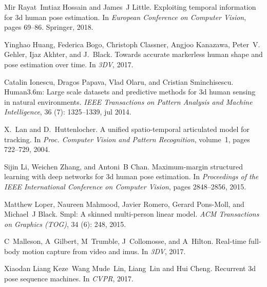 \documentclass{bmvc2k}
\begin{document}
\begin{thebibliography}{47}
Mir Rayat~Imtiaz Hossain and James~J Little.
\newblock Exploiting temporal information for 3d human pose estimation.
\newblock In \emph{European Conference on Computer Vision}, pages 69--86.
  Springer, 2018.

Yinghao Huang, Federica Bogo, Christoph Classner, Angjoo Kanazawa, Peter~V.
  Gehler, Ijaz Akhter, and J.~Black.
\newblock Towards accurate markerless human shape and pose estimation over
  time.
\newblock In \emph{3DV}, 2017.

Catalin Ionescu, Dragos Papava, Vlad Olaru, and Cristian Sminchisescu.
\newblock Human3.6m: Large scale datasets and predictive methods for 3d human
  sensing in natural environments.
\newblock \emph{IEEE Transactions on Pattern Analysis and Machine
  Intelligence}, 36 (7): 1325--1339, jul 2014.

X.~Lan and D.~Huttenlocher.
\newblock A unified spatio-temporal articulated model for tracking.
\newblock In \emph{Proc. Computer Vision and Pattern Recognition}, volume~1,
  pages 722--729, 2004.

Sijin Li, Weichen Zhang, and Antoni~B Chan.
\newblock Maximum-margin structured learning with deep networks for 3d human
  pose estimation.
\newblock In \emph{Proceedings of the IEEE International Conference on Computer
  Vision}, pages 2848--2856, 2015.

Matthew Loper, Naureen Mahmood, Javier Romero, Gerard Pons-Moll, and Michael~J
  Black.
\newblock Smpl: A skinned multi-person linear model.
\newblock \emph{ACM Transactions on Graphics (TOG)}, 34 (6):
  248, 2015.

C~Malleson, A~Gilbert, M~Trumble, J~Collomosse, and A~Hilton.
\newblock Real-time full-body motion capture from video and imus.
\newblock In \emph{3DV}, 2017.

Xiaodan Liang Keze~Wang Mude~Lin, Liang~Lin and Hui Cheng.
\newblock Recurrent 3d pose sequence machines.
\newblock In \emph{CVPR}, 2017.


\end{thebibliography}
\end{document}
